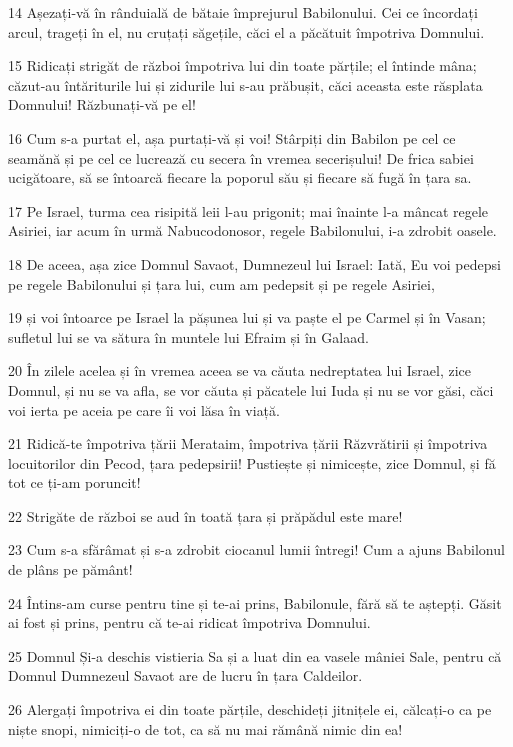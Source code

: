\par 14 Așezați-vă în rânduială de bătaie împrejurul Babilonului. Cei ce încordați arcul, trageți în el, nu cruțați săgețile, căci el a păcătuit împotriva Domnului.
\par 15 Ridicați strigăt de război împotriva lui din toate părțile; el întinde mâna; căzut-au întăriturile lui și zidurile lui s-au prăbușit, căci aceasta este răsplata Domnului! Răzbunați-vă pe el!
\par 16 Cum s-a purtat el, așa purtați-vă și voi! Stârpiți din Babilon pe cel ce seamănă și pe cel ce lucrează cu secera în vremea secerișului! De frica sabiei ucigătoare, să se întoarcă fiecare la poporul său și fiecare să fugă în țara sa.
\par 17 Pe Israel, turma cea risipită leii l-au prigonit; mai înainte l-a mâncat regele Asiriei, iar acum în urmă Nabucodonosor, regele Babilonului, i-a zdrobit oasele.
\par 18 De aceea, așa zice Domnul Savaot, Dumnezeul lui Israel: Iată, Eu voi pedepsi pe regele Babilonului și țara lui, cum am pedepsit și pe regele Asiriei,
\par 19 și voi întoarce pe Israel la pășunea lui și va paște el pe Carmel și în Vasan; sufletul lui se va sătura în muntele lui Efraim și în Galaad.
\par 20 În zilele acelea și în vremea aceea se va căuta nedreptatea lui Israel, zice Domnul, și nu se va afla, se vor căuta și păcatele lui Iuda și nu se vor găsi, căci voi ierta pe aceia pe care îi voi lăsa în viață.
\par 21 Ridică-te împotriva țării Merataim, împotriva țării Răzvrătirii și împotriva locuitorilor din Pecod, țara pedepsirii! Pustiește și nimicește, zice Domnul, și fă tot ce ți-am poruncit!
\par 22 Strigăte de război se aud în toată țara și prăpădul este mare!
\par 23 Cum s-a sfărâmat și s-a zdrobit ciocanul lumii întregi! Cum a ajuns Babilonul de plâns pe pământ!
\par 24 Întins-am curse pentru tine și te-ai prins, Babilonule, fără să te aștepți. Găsit ai fost și prins, pentru că te-ai ridicat împotriva Domnului.
\par 25 Domnul Și-a deschis vistieria Sa și a luat din ea vasele mâniei Sale, pentru că Domnul Dumnezeul Savaot are de lucru în țara Caldeilor.
\par 26 Alergați împotriva ei din toate părțile, deschideți jitnițele ei, călcați-o ca pe niște snopi, nimiciți-o de tot, ca să nu mai rămână nimic din ea!
